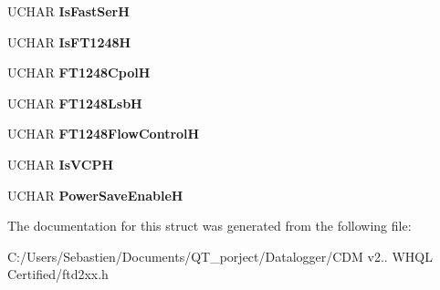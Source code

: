 \begin{DoxyCompactItemize}
U\+C\+H\+AR {\bfseries Is\+Fast\+SerH}
\item 
\mbox{\label{structft__program__data_a449c65a49b91d6c34045632b662834ab}} 
U\+C\+H\+AR {\bfseries Is\+F\+T1248H}
\item 
\mbox{\label{structft__program__data_a60a9e8a5d36a0e3afcb3236f82a99b1d}} 
U\+C\+H\+AR {\bfseries F\+T1248\+CpolH}
\item 
\mbox{\label{structft__program__data_a4088d357bd88bee7c601fa525a9175ea}} 
U\+C\+H\+AR {\bfseries F\+T1248\+LsbH}
\item 
\mbox{\label{structft__program__data_accb9f60cb1450ffd7d942e95729188ed}} 
U\+C\+H\+AR {\bfseries F\+T1248\+Flow\+ControlH}
\item 
\mbox{\label{structft__program__data_aa92920576a9253a1ea656bb9979bdace}} 
U\+C\+H\+AR {\bfseries Is\+V\+C\+PH}
\item 
\mbox{\label{structft__program__data_a52194d4e0e5d8f880186dcdb507d966a}} 
U\+C\+H\+AR {\bfseries Power\+Save\+EnableH}
\end{DoxyCompactItemize}


The documentation for this struct was generated from the following file\+:\begin{DoxyCompactItemize}
\item 
C\+:/\+Users/\+Sebastien/\+Documents/\+Q\+T\+\_\+porject/\+Datalogger/\+C\+D\+M v2.. W\+H\+Q\+L Certified/ftd2xx.\+h\end{DoxyCompactItemize}

